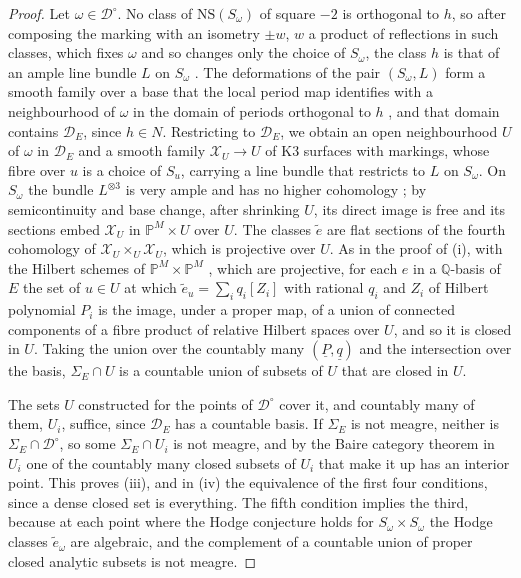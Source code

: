\documentclass[11pt,reqno]{amsart}
\theoremstyle{plain}
\theoremstyle{definition}
\theoremstyle{remark}
\newcommand{\QQ}{\mathbb{Q}}
\newcommand{\PP}{\mathbb{P}}
\newcommand{\cD}{\mathcal{D}}
\newcommand{\cX}{\mathcal{X}}
\newcommand{\NS}{\mathrm{NS}}
\begin{document}
\begin{proof}
Let $\omega\in\cD^{\circ}$. No class of $\NS(S_{\omega})$ of square $-2$ is
orthogonal to $h$, so after composing the marking with an isometry $\pm w$,
$w$ a product of reflections in such classes, which fixes $\omega$ and so
changes only the choice of $S_{\omega}$, the class $h$ is that of an ample
line bundle $L$ on $S_{\omega}$ \cite[Ch.~8]{Huy16}. The deformations of the
pair $(S_{\omega},L)$ form a smooth family over a base that the local period
map identifies with a neighbourhood of $\omega$ in the domain of periods
orthogonal to $h$ \cite[Ch.~6]{Huy16}, and that domain contains $\cD_{E}$,
since $h\in N$. Restricting to $\cD_{E}$, we obtain an open neighbourhood $U$
of $\omega$ in $\cD_{E}$ and a smooth family $\cX_{U}\to U$ of K3 surfaces with
markings, whose fibre over $u$ is a choice of $S_{u}$, carrying a line bundle
that restricts to $L$ on $S_{\omega}$. On $S_{\omega}$ the bundle
$L^{\otimes3}$ is very ample and has no higher cohomology
\cite[Ch.~2]{Huy16}; by semicontinuity and base change, after shrinking $U$,
its direct image is free and its sections embed $\cX_{U}$ in
$\PP^{M}\times U$ over $U$. The classes $\tilde e$ are flat sections of the
fourth cohomology of $\cX_{U}\times_{U}\cX_{U}$, which is projective over $U$.
As in the proof of (i), with the Hilbert schemes of
$\PP^{M}\times\PP^{M}$ \cite{Gro61}, which are projective, for each $e$ in a
$\QQ$-basis of $E$ the set of $u\in U$ at which
$\tilde e_{u}=\sum_{i}q_{i}[Z_{i}]$ with rational $q_{i}$ and $Z_{i}$ of
Hilbert polynomial $P_{i}$ is the image, under a proper map, of a union of
connected components of a fibre product of relative Hilbert spaces over $U$,
and so it is closed in $U$. Taking the union over the countably many
$(\underline{P},\underline{q})$ and the intersection over the basis,
$\Sigma_{E}\cap U$ is a countable union of subsets of $U$ that are closed in
$U$.

The sets $U$ constructed for the points of $\cD^{\circ}$ cover it, and
countably many of them, $U_{i}$, suffice, since $\cD_{E}$ has a countable
basis. If $\Sigma_{E}$ is not meagre, neither is
$\Sigma_{E}\cap\cD^{\circ}$, so some $\Sigma_{E}\cap U_{i}$ is not meagre, and
by the Baire category theorem in $U_{i}$ one of the countably many closed
subsets of $U_{i}$ that make it up has an interior point. This proves (iii),
and in (iv) the equivalence of the first four conditions, since a dense
closed set is everything. The fifth condition implies the third, because at
each point where the Hodge conjecture holds for $S_{\omega}\times S_{\omega}$
the Hodge classes $\tilde e_{\omega}$ are algebraic, and the complement of a
countable union of proper closed analytic subsets is not meagre.


\end{proof}
\end{document}
